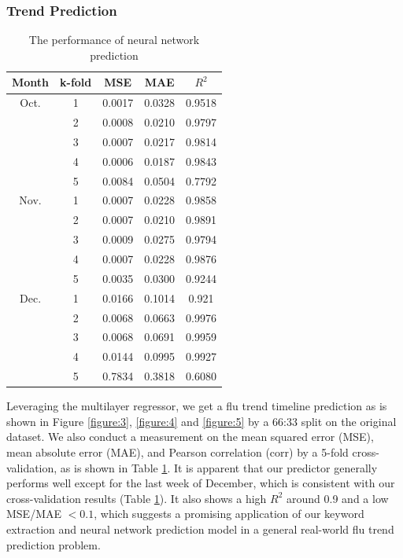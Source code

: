 \documentclass[12pt, oneside]{article}
\begin{document}
\subsubsection{Trend Prediction}


\begin{table}[H]
  \centering
  \begin{adjustbox}{max width=\textwidth}
    \begin{tabular}{| c | c | c | c | c |} 
      \hline
      \textbf{Month} & \textbf{k-fold} & \textbf{MSE} & \textbf{MAE} & \textbf{$R^2$} \\ [0.5ex] 
      \hline
      \hline
      Oct. & 1& 0.0017 & 0.0328 & 0.9518 \\
      & 2 & 0.0008 & 0.0210 & 0.9797 \\
      & 3 & 0.0007 &  0.0217 & 0.9814 \\
      & 4 & 0.0006 & 0.0187 & 0.9843 \\
      & 5 & 0.0084 & 0.0504 & 0.7792 \\
      Nov. & 1& 0.0007 & 0.0228 & 0.9858 \\
      & 2 & 0.0007 & 0.0210 & 0.9891 \\
      & 3 & 0.0009 &  0.0275 & 0.9794 \\
      & 4 & 0.0007 & 0.0228 & 0.9876 \\
      & 5 & 0.0035 & 0.0300 & 0.9244 \\
      Dec. & 1& 0.0166 & 0.1014 & 0.921 \\
      & 2 & 0.0068 & 0.0663 & 0.9976 \\
      & 3 & 0.0068 & 0.0691 & 0.9959 \\
      & 4 & 0.0144 & 0.0995 & 0.9927 \\
      & 5 & 0.7834 & 0.3818 & 0.6080 \\
      \hline
    \end{tabular}
  \end{adjustbox}
  \caption{The performance of neural network prediction}
  \label{table:4}
\end{table}


Leveraging the multilayer regressor, we get a flu trend timeline prediction as is shown in Figure \ref{figure:3},
\ref{figure:4} and \ref{figure:5} by a 66:33 split on the original dataset.
We also conduct a measurement on the mean squared error (MSE), mean absolute error (MAE), and Pearson correlation (corr) by a 5-fold cross-validation,
as is shown in Table \ref{table:4}.
It is apparent that our predictor generally performs well except for the last week of December, which is consistent with our cross-validation results (Table \ref{table:4}).
It also shows a high $R^2$ around 0.9 and a low MSE/MAE $< 0.1$, which suggests a promising application of our keyword extraction and neural network prediction model
in a general real-world flu trend prediction problem.
\end{document}
